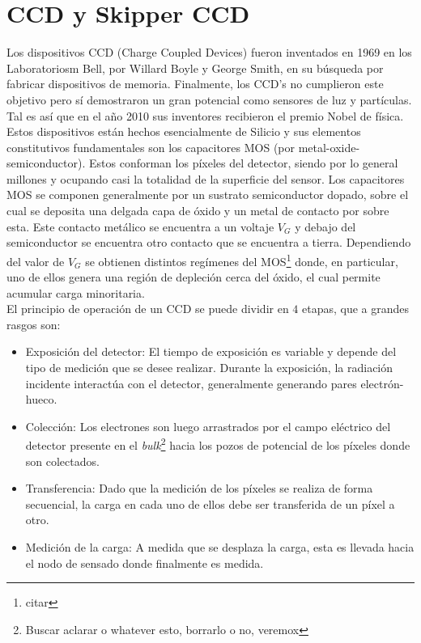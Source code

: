 \section{CCD y Skipper CCD}
\noindent Los dispositivos CCD (Charge Coupled Devices) fueron inventados en 1969 en los Laboratoriosm Bell, por Willard Boyle y George Smith, en su búsqueda por fabricar dispositivos de memoria. Finalmente, los CCD's no cumplieron este objetivo pero sí demostraron un gran potencial como sensores de luz y partículas. Tal es así que en el año 2010 sus inventores recibieron el premio Nobel de física\cite{Boyle, Alig}.\\
\indent Estos dispositivos están hechos esencialmente de Silicio y sus elementos constitutivos fundamentales son los capacitores MOS (por metal-oxide-semiconductor). Estos conforman los píxeles del detector, siendo por lo general millones y ocupando casi la totalidad de la superficie del sensor. Los capacitores MOS se componen generalmente por un sustrato semiconductor dopado, sobre el cual se deposita una delgada capa de óxido y un metal de contacto por sobre esta. Este contacto metálico se encuentra a un voltaje $V_{G}$ y debajo del semiconductor se encuentra otro contacto que se encuentra a tierra. Dependiendo del valor de $V_{G}$ se obtienen distintos regímenes del MOS\footnote{citar} donde, en particular, uno de ellos genera una región de depleción cerca del óxido, el cual permite acumular carga minoritaria.\\
\indent El principio de operación de un CCD se puede dividir en $4$ etapas, que a grandes rasgos son:
\begin{itemize}
    \item Exposición del detector: El tiempo de exposición es variable y depende del tipo de medición que se desee realizar. Durante la exposición, la radiación incidente interactúa con el detector, generalmente generando pares electrón-hueco. 
    \item Colección: Los electrones son luego arrastrados por el campo eléctrico del detector presente en el \textit{bulk}\footnote{Buscar aclarar o whatever esto, borrarlo o no, veremox} hacia los pozos de potencial de los píxeles donde son colectados.
    \item Transferencia: Dado que la medición de los píxeles se realiza de forma secuencial, la carga en cada uno de ellos debe ser transferida de un píxel a otro.
    \item Medición de la carga: A medida que se desplaza la carga, esta es llevada hacia el nodo de sensado donde finalmente es medida.
\end{itemize}

